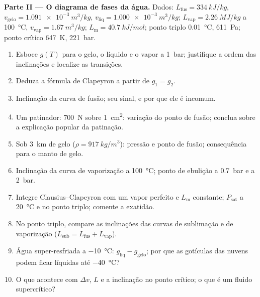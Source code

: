 \begin{problem}
\textbf{Parte II --- O diagrama de fases da água.}
Dados: $L_{\text{fus}} = \qty{334}{kJ/kg}$, $v_{\text{gelo}} = \qty{1.091e-3}{m^3/kg}$,
$v_{\text{liq}} = \qty{1.000e-3}{m^3/kg}$; $L_{\text{vap}} = \qty{2.26}{MJ/kg}$ a
\qty{100}{\celsius}, $v_{\text{vap}} = \qty{1.67}{m^3/kg}$; $L_{\text{m}} = \qty{40.7}{kJ/mol}$;
ponto triplo \qty{0.01}{\celsius}, \qty{611}{Pa}; ponto crítico \qty{647}{K},
\qty{221}{bar}.
\begin{enumerate}[resume]
  \item Esboce $g(T)$ para o gelo, o líquido e o vapor a \qty{1}{bar}; justifique
        a ordem das inclinações e localize as transições.
  \item Deduza a fórmula de Clapeyron a partir de $g_1 = g_2$.
  \item Inclinação da curva de fusão; seu sinal, e por que ele é incomum.
  \item Um patinador: \qty{700}{N} sobre \qty{1}{cm^2}: variação do ponto de
        fusão; conclua sobre a explicação popular da patinação.
  \item Sob \qty{3}{km} de gelo ($\rho = \qty{917}{kg/m^3}$): pressão e
        ponto de fusão; consequência para o manto de gelo.
  \item Inclinação da curva de vaporização a \qty{100}{\celsius}; ponto de
        ebulição a \qty{0.7}{bar} e a \qty{2}{bar}.
  \item Integre Clausius--Clapeyron com um vapor perfeito e
        $L_{\text{m}}$ constante; $P_{\text{sat}}$ a \qty{20}{\celsius} e no
        ponto triplo; comente a exatidão.
  \item No ponto triplo, compare as inclinações das curvas de sublimação e de
        vaporização ($L_{\text{sub}} = L_{\text{fus}} + L_{\text{vap}}$).
  \item Água super-resfriada a \qty{-10}{\celsius}: $g_{\text{liq}} - g_{\text{gelo}}$;
        por que as gotículas das nuvens podem ficar líquidas até \qty{-40}{\celsius}?
  \item O que acontece com $\Delta v$, $L$ e a inclinação no ponto
        crítico; o que é um fluido supercrítico?
\end{enumerate}


\end{problem}
